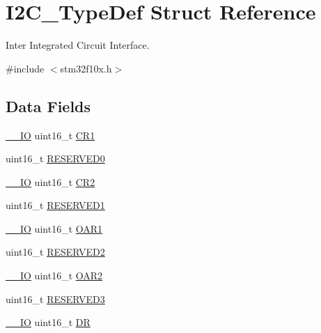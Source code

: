 \hypertarget{struct_i2_c___type_def}{}\section{I2\+C\+\_\+\+Type\+Def Struct Reference}
\label{struct_i2_c___type_def}


Inter Integrated Circuit Interface.  




{\ttfamily \#include $<$stm32f10x.\+h$>$}

\subsection*{Data Fields}
\begin{DoxyCompactItemize}
\item 
\mbox{\hyperlink{core__sc300_8h_aec43007d9998a0a0e01faede4133d6be}{\+\_\+\+\_\+\+IO}} uint16\+\_\+t \mbox{\hyperlink{struct_i2_c___type_def_a61400ce239355b62aa25c95fcc18a5e1}{C\+R1}}
\item 
uint16\+\_\+t \mbox{\hyperlink{struct_i2_c___type_def_a149feba01f9c4a49570c6d88619f504f}{R\+E\+S\+E\+R\+V\+E\+D0}}
\item 
\mbox{\hyperlink{core__sc300_8h_aec43007d9998a0a0e01faede4133d6be}{\+\_\+\+\_\+\+IO}} uint16\+\_\+t \mbox{\hyperlink{struct_i2_c___type_def_a2a3e81bd118d1bc52d24a0b0772e6a0c}{C\+R2}}
\item 
uint16\+\_\+t \mbox{\hyperlink{struct_i2_c___type_def_a8249a3955aace28d92109b391311eb30}{R\+E\+S\+E\+R\+V\+E\+D1}}
\item 
\mbox{\hyperlink{core__sc300_8h_aec43007d9998a0a0e01faede4133d6be}{\+\_\+\+\_\+\+IO}} uint16\+\_\+t \mbox{\hyperlink{struct_i2_c___type_def_aaab934113da0a8bcacd1ffa148046569}{O\+A\+R1}}
\item 
uint16\+\_\+t \mbox{\hyperlink{struct_i2_c___type_def_a5573848497a716a9947fd87487709feb}{R\+E\+S\+E\+R\+V\+E\+D2}}
\item 
\mbox{\hyperlink{core__sc300_8h_aec43007d9998a0a0e01faede4133d6be}{\+\_\+\+\_\+\+IO}} uint16\+\_\+t \mbox{\hyperlink{struct_i2_c___type_def_a692c0f6e38cde9ec1c3c50c36aa79817}{O\+A\+R2}}
\item 
uint16\+\_\+t \mbox{\hyperlink{struct_i2_c___type_def_a6c3b31022e6f59b800e9f5cc2a89d54c}{R\+E\+S\+E\+R\+V\+E\+D3}}
\item 
\mbox{\hyperlink{core__sc300_8h_aec43007d9998a0a0e01faede4133d6be}{\+\_\+\+\_\+\+IO}} uint16\+\_\+t \mbox{\hyperlink{struct_i2_c___type_def_a0a1acc0425516ff7969709d118b96a3b}{DR}}

\end{DoxyCompactItemize}

